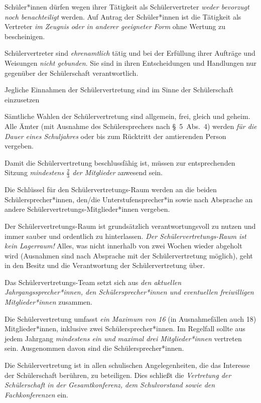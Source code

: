 \documentclass[10pt,a4paper,oneside,parskip=half]{scrartcl}
\begin{document}
\begin{contract}
Schüler*innen dürfen wegen ihrer Tätigkeit als Schülervertreter \emph{weder bevorzugt noch benachteiligt} werden. Auf Antrag der Schüler*innen ist die Tätigkeit als Vertreter \emph{im Zeugnis oder in anderer geeigneter Form} ohne Wertung zu bescheinigen.
	
Schülervertreter sind \emph{ehrenamtlich} tätig und bei der Erfüllung ihrer Aufträge und Weisungen \emph{nicht gebunden}. Sie sind in ihren Entscheidungen und Handlungen nur gegenüber der Schülerschaft verantwortlich.

Jegliche Einnahmen der Schülervertretung sind im Sinne der Schülerschaft einzusetzen

Sämtliche Wahlen der Schülervertretung sind allgemein, frei, gleich und geheim. Alle Ämter (mit Ausnahme des Schülersprechers nach §~5~Abs.~4) werden \emph{für die Dauer eines Schuljahres} oder bis zum Rücktritt der amtierenden Person vergeben.

Damit die Schülervertretung beschlussfähig ist, müssen zur entsprechenden Sitzung \emph{mindestens $\frac{2}{3}$ der Mitglieder} anwesend sein.

Die Schlüssel für den Schülervertretungs-Raum werden an die beiden Schülersprecher*innen, den/die Unterstufensprecher*in sowie nach Absprache an andere Schülervertretungs-Mitglieder*innen vergeben.

Der Schülervertretungs-Raum ist grundsätzlich verantwortungsvoll zu nutzen und immer sauber und ordentlich zu hinterlassen. \emph{Der Schülervertretungs-Raum ist \emph{kein} Lagerraum!} Alles, was nicht innerhalb von zwei Wochen wieder abgeholt wird (Ausnahmen sind nach Absprache mit der Schülervertretung möglich), geht in den Besitz und die Verantwortung der Schülervertretung über.

Das Schülervertretungs-Team setzt sich aus \emph{den aktuellen Jahrgangssprecher*innen, den Schülersprecher*innen und eventuellen freiwilligen Mitglieder*innen} zusammen.

Die Schülervertretung umfasst \emph{ein Maximum von 16} (in Ausnahmefällen auch 18) Mitglieder*innen, inklusive zwei Schülersprecher*innen. Im Regelfall sollte aus jedem Jahrgang \emph{mindestens ein und maximal drei Mitglieder*innen} vertreten sein. Ausgenommen davon sind die Schülersprecher*innen.

Die Schülervertretung ist in allen schulischen Angelegenheiten, die das Interesse der Schülerschaft berühren, zu beteiligen. Dies schließt die \emph{Vertretung der Schülerschaft in der Gesamtkonferenz, dem Schulvorstand sowie den Fachkonferenzen} ein.


\end{contract}
\end{document}
